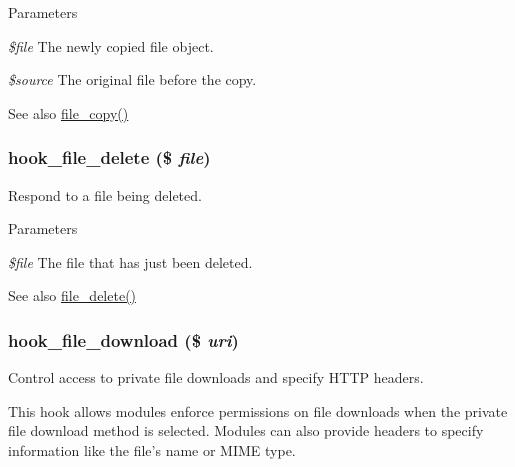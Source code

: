 \begin{DoxyParams}{Parameters}
\item[{\em \$file}]The newly copied file object. \item[{\em \$source}]The original file before the copy.\end{DoxyParams}
\begin{DoxySeeAlso}{See also}
\hyperlink{group__file_gae49a2da7203ef43ae7adcf128d58d860}{file\_\-copy()} 
\end{DoxySeeAlso}
\hypertarget{group__hooks_gafa88683ad014451b3fbc9ca9bb80afdd}{
\subsubsection[{hook\_\-file\_\-delete}]{\setlength{\rightskip}{0pt plus 5cm}hook\_\-file\_\-delete (\$ {\em file})}}
\label{group__hooks_gafa88683ad014451b3fbc9ca9bb80afdd}
Respond to a file being deleted.


\begin{DoxyParams}{Parameters}
\item[{\em \$file}]The file that has just been deleted.\end{DoxyParams}
\begin{DoxySeeAlso}{See also}
\hyperlink{group__file_gac7503f0dcdea965d68e4a242e7760921}{file\_\-delete()} 
\end{DoxySeeAlso}
\hypertarget{group__hooks_gab73f0e658d6630220ba7836ccd011ecc}{
\subsubsection[{hook\_\-file\_\-download}]{\setlength{\rightskip}{0pt plus 5cm}hook\_\-file\_\-download (\$ {\em uri})}}
\label{group__hooks_gab73f0e658d6630220ba7836ccd011ecc}
Control access to private file downloads and specify HTTP headers.

This hook allows modules enforce permissions on file downloads when the private file download method is selected. Modules can also provide headers to specify information like the file's name or MIME type.


